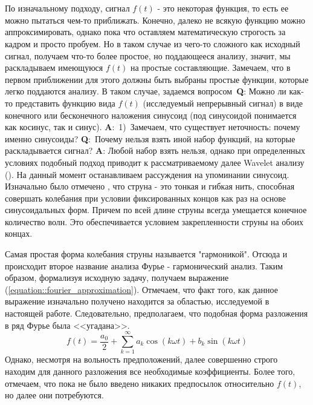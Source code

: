  \label{link::fourier_analysis}
\\\\
\indent По изначальному подходу, сигнал $f(t)$ - это некоторая функция, то есть ее можно пытаться чем-то приближать. Конечно, далеко не всякую функцию можно аппроксимировать, однако пока что оставляем математическую строгость за кадром и просто пробуем. Но в таком случае из чего-то сложного как исходный сигнал, получаем что-то более простое, но поддающееся анализу, значит, мы раскладываем имеющуюся $f(t)$ на простые составляющие. Замечаем, что в первом приближении для этого должны быть выбраны простые функции, которые легко поддаются анализу. В таком случае, задаемся вопросом~\textbf{Q}: Можно ли как-то представить функцию вида $f(t)$ (исследуемый непрерывный сигнал) в виде конечного или бесконечного наложения синусоид (под синусоидой понимается как косинус, так и синус). \textbf{A}:~1)~Замечаем, что существует неточность: почему именно синусоиды? \textbf{Q}:~Почему нельзя взять иной набор функций, на которые раскладывается сигнал? \textbf{A}: Любой набор взять нельзя, однако при определенных условиях подобный подход приводит к рассматриваемому далее Wavelet анализу (). На данный момент останавливаем рассуждения на  упоминании синусоид. Изначально было отмечено \cite{mipt2021string}, что струна - это тонкая и гибкая нить, способная совершать колебания при условии фиксированных концов как раз на основе синусоидальных форм. Причем по всей длине струны всегда умещается конечное количество волн. Это обеспечивается условием закрепленности струны на обоих концах. 

Самая простая форма колебания струны называется "гармоникой". Отсюда и происходит второе название анализа Фурье - гармонический анализ. Таким образом, формализуя исходную задачу, получаем выражение (\ref{equation::fourier_approximation}). Отмечаем, что факт того, как данное выражение изначально получено находится за областью, исследуемой в настоящей работе. Следовательно, предполагаем, что подобная форма разложения в ряд Фурье была <<угадана>>. 
\begin{equation} \label{equation::fourier_approximation}
	f(t) = \frac{a_0}{2} + \sum_{k = 1}^{\infty} a_k\cos(k \omega t) + b_k\sin(k \omega t)
\end{equation}
\indent Однако, несмотря на вольность предположений, далее совершенно строго находим для данного разложения все необходимые коэффициенты. Более того, отмечаем, что пока не было введено никаких предпосылок относительно $f(t)$, но далее они потребуются.

